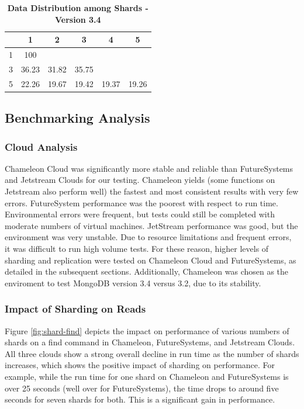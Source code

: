 \documentclass[9pt,twocolumn,twoside]{../../styles/osajnl}
\begin{document}
\begin{table}[htbp]
\centering
\caption{\bf Data Distribution among Shards - Version 3.4}

 \begin{tabular}{| c | c | c | c | c | c |} 
 \hline
  &  1    &  2    &  3    &   4   & 5 \\ [0.5ex]
\hline
  \hline
1 & 100   &       &       &       &   \\
\hline
3 & 36.23 & 31.82 & 35.75 &       &   \\
\hline
5 & 22.26 & 19.67 & 19.42 & 19.37 & 19.26   \\
\hline
\end{tabular}
  \label{tab:data-dist34}
\end{table}






\subsection{Benchmarking Analysis}


\subsubsection{Cloud Analysis}

Chameleon Cloud was significantly more stable and reliable than FutureSystems and Jetstream Clouds for our testing.  Chameleon yields (some functions on Jetstream also perform well) the fastest and most consistent results with very few errors.  FutureSystem performance was the poorest with respect to run time.  Environmental errors were frequent, but tests could still be completed with moderate numbers of virtual machines.  JetStream performance was good, but the environment was very unstable.  Due to resource limitations and frequent errors, it was difficult to run high volume tests.  For these reason, higher levels of sharding and replication were tested on Chameleon Cloud and FutureSystems, as detailed in the subsequent sections.  Additionally, Chameleon was chosen as the enviroment to test MongoDB version 3.4 versus 3.2, due to its stability.

\subsubsection{Impact of Sharding on Reads}




Figure \ref{fig:shard-find} depicts the impact on performance of various numbers of shards on a find command in Chameleon, FutureSystems, and Jetstream Clouds.  All three clouds show a strong overall decline in run time as the number of shards increases, which shows the positive impact of sharding on performance.  For example, while the run time for one shard on Chameleon and FutureSystems is over 25 seconds (well over for FutureSystems), the time drops to around five seconds for seven shards for both.  This is a significant gain in performance. 
\end{document}
